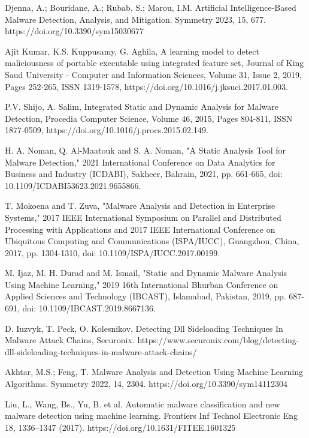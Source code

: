 \documentclass{article}
\begin{document}
\begin{thebibliography}{9}
Djenna, A.; Bouridane, A.; Rubab, S.; Marou, I.M. Artificial Intelligence-Based Malware Detection, Analysis, and Mitigation. Symmetry 2023, 15, 677. https://doi.org/10.3390/sym15030677

Ajit Kumar, K.S. Kuppusamy, G. Aghila, A learning model to detect maliciousness of portable executable using integrated feature set, Journal of King Saud University - Computer and Information Sciences, Volume 31, Issue 2, 2019, Pages 252-265, ISSN 1319-1578, https://doi.org/10.1016/j.jksuci.2017.01.003.

P.V. Shijo, A. Salim, Integrated Static and Dynamic Analysis for Malware Detection, Procedia Computer Science, Volume 46, 2015, Pages 804-811, ISSN 1877-0509, https://doi.org/10.1016/j.procs.2015.02.149. 

H. A. Noman, Q. Al-Maatouk and S. A. Noman, "A Static Analysis Tool for Malware Detection," 2021 International Conference on Data Analytics for Business and Industry (ICDABI), Sakheer, Bahrain, 2021, pp. 661-665, doi: 10.1109/ICDABI53623.2021.9655866. 

T. Mokoena and T. Zuva, "Malware Analysis and Detection in Enterprise Systems," 2017 IEEE International Symposium on Parallel and Distributed Processing with Applications and 2017 IEEE International Conference on Ubiquitous Computing and Communications (ISPA/IUCC), Guangzhou, China, 2017, pp. 1304-1310, doi: 10.1109/ISPA/IUCC.2017.00199. 

M. Ijaz, M. H. Durad and M. Ismail, "Static and Dynamic Malware Analysis Using Machine Learning," 2019 16th International Bhurban Conference on Applied Sciences and Technology (IBCAST), Islamabad, Pakistan, 2019, pp. 687-691, doi: 10.1109/IBCAST.2019.8667136.

D. Iuzvyk, T. Peck, O. Kolesnikov, Detecting Dll Sideloading Techniques In Malware Attack Chains, Securonix. https://www.securonix.com/blog/detecting-dll-sideloading-techniques-in-malware-attack-chains/ 

Akhtar, M.S.; Feng, T. Malware Analysis and Detection Using Machine Learning Algorithms. Symmetry 2022, 14, 2304. https://doi.org/10.3390/sym14112304 

Liu, L., Wang, Bs., Yu, B. et al. Automatic malware classification and new malware detection using machine learning. Frontiers Inf Technol Electronic Eng 18, 1336–1347 (2017). https://doi.org/10.1631/FITEE.1601325


\end{thebibliography}
\end{document}
